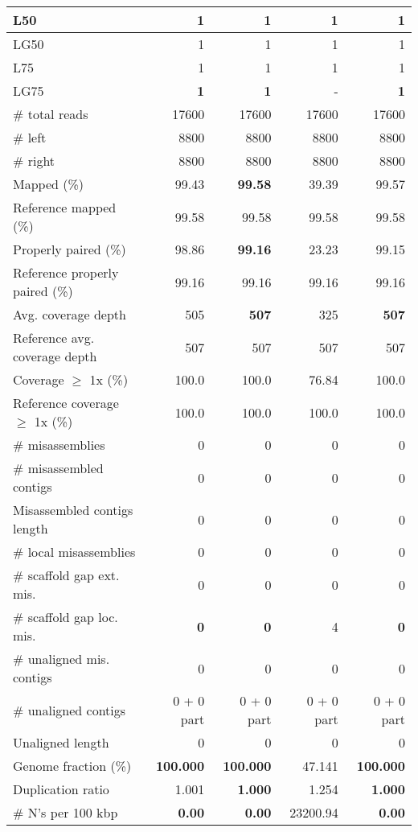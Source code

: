 \documentclass[12pt,a4paper]{article}
\begin{document}
\begin{table}[ht]
\begin{center}
\begin{tabular}{|l*{4}{|r}|}
L50 & 1 & 1 & 1 & 1 \\ \hline
LG50 & 1 & 1 & 1 & 1 \\ \hline
L75 & 1 & 1 & 1 & 1 \\ \hline
LG75 & {\bf 1} & {\bf 1} & - & {\bf 1} \\ \hline
\# total reads & 17600 & 17600 & 17600 & 17600 \\ \hline
\# left & 8800 & 8800 & 8800 & 8800 \\ \hline
\# right & 8800 & 8800 & 8800 & 8800 \\ \hline
Mapped (\%) & 99.43 & {\bf 99.58} & 39.39 & 99.57 \\ \hline
Reference mapped (\%) & 99.58 & 99.58 & 99.58 & 99.58 \\ \hline
Properly paired (\%) & 98.86 & {\bf 99.16} & 23.23 & 99.15 \\ \hline
Reference properly paired (\%) & 99.16 & 99.16 & 99.16 & 99.16 \\ \hline
Avg. coverage depth & 505 & {\bf 507} & 325 & {\bf 507} \\ \hline
Reference avg. coverage depth & 507 & 507 & 507 & 507 \\ \hline
Coverage $\geq$ 1x (\%) & 100.0 & 100.0 & 76.84 & 100.0 \\ \hline
Reference coverage $\geq$ 1x (\%) & 100.0 & 100.0 & 100.0 & 100.0 \\ \hline
\# misassemblies & 0 & 0 & 0 & 0 \\ \hline
\# misassembled contigs & 0 & 0 & 0 & 0 \\ \hline
Misassembled contigs length & 0 & 0 & 0 & 0 \\ \hline
\# local misassemblies & 0 & 0 & 0 & 0 \\ \hline
\# scaffold gap ext. mis. & 0 & 0 & 0 & 0 \\ \hline
\# scaffold gap loc. mis. & {\bf 0} & {\bf 0} & 4 & {\bf 0} \\ \hline
\# unaligned mis. contigs & 0 & 0 & 0 & 0 \\ \hline
\# unaligned contigs & 0 + 0 part & 0 + 0 part & 0 + 0 part & 0 + 0 part \\ \hline
Unaligned length & 0 & 0 & 0 & 0 \\ \hline
Genome fraction (\%) & {\bf 100.000} & {\bf 100.000} & 47.141 & {\bf 100.000} \\ \hline
Duplication ratio & 1.001 & {\bf 1.000} & 1.254 & {\bf 1.000} \\ \hline
\# N's per 100 kbp & {\bf 0.00} & {\bf 0.00} & 23200.94 & {\bf 0.00} \\ \hline

\end{tabular}
\end{center}
\end{table}
\end{document}
